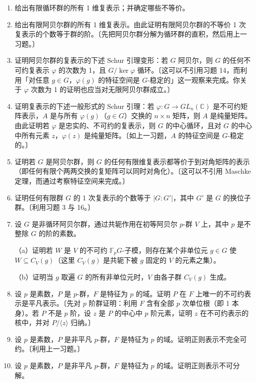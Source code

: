 \begin{enumerate}
（d）证明若 \(\varphi\) 是忠实的不可约表示，则 \(G\) 的中心循环。

（e）由（d）推出若 \(G\) 阿贝尔且 \(\varphi\) 是任意不可约表示，则 \(G/\ker\varphi\) 循环。

\item 给出有限循环群的所有 1 维复表示；并确定哪些不等价。

\item 给出有限阿贝尔群的所有 1 维复表示。由此证明有限阿贝尔群的不等价 1 次复表示的个数等于群的阶。〔先把阿贝尔群分解为循环群的直积，然后用上一习题。〕

\item 证明阿贝尔群的复表示的下述 Schur 引理变形：若 \(G\) 阿贝尔，则 \(G\) 的任何不可约复表示 \(\varphi\) 的次数为 1，且 \(G/\ker\varphi\) 循环。〔这可以不引用习题 14，而利用「对任意 \(g \in G\)，\(\varphi(g)\) 的特征空间是 \(G\)-稳定的」这一观察来完成。你关于 \(\varphi\) 次数为 1 的证明也应当对无限阿贝尔群成立。〕

\item 证明复表示的下述一般形式的 Schur 引理：若 \(\varphi : G \to GL_n(\mathbb{C})\) 是不可约矩阵表示，\(A\) 是与所有 \(\varphi(g)\)（\(g \in G\)）交换的 \(n \times n\) 矩阵，则 \(A\) 是纯量矩阵。由此证明若 \(\varphi\) 是忠实的、不可约的复表示，则 \(G\) 的中心循环，且对 \(G\) 的中心中所有元素 \(z\)，\(\varphi(z)\) 是纯量矩阵。〔如上一习题，\(A\) 的特征空间是 \(G\)-稳定的。〕

\item 证明若 \(G\) 是阿贝尔群，则 \(G\) 的任何有限维复表示都等价于到对角矩阵的表示（即任何有限个两两交换的复矩阵可以同时对角化）。〔这可以不引用 Maschke 定理，而通过考察特征空间来完成。〕

\item 证明任何有限群 \(G\) 的 1 次复表示的个数等于 \(|G:G'|\)，其中 \(G'\) 是 \(G\) 的换位子群。〔利用习题 3 与 16。〕

\item 设 \(G\) 是非循环阿贝尔群，通过共轭作用在初等阿贝尔 \(p\)-群 \(V\) 上，其中 \(p\) 是不整除 \(G\) 的阶的素数。

（a）证明若 \(W\) 是 \(V\) 的不可约 \(\mathbb{F}_pG\)-子模，则存在某个非单位元 \(g \in G\) 使 \(W \subseteq C_V(g)\)（这里 \(C_V(g)\) 是共轭下被 \(g\) 固定的 \(V\) 的元素之集）。

（b）证明当 \(g\) 取遍 \(G\) 的所有非单位元时，\(V\) 由各子群 \(C_V(g)\) 生成。

\item 设 \(p\) 是素数，\(P\) 是 \(p\)-群，\(F\) 是特征为 \(p\) 的域。证明 \(P\) 在 \(F\) 上唯一的不可约表示是平凡表示。〔先对 \(p\) 阶群证明：利用 \(F\) 含有全部 \(p\) 次单位根（即 1 本身）。若 \(P\) 不是 \(p\) 阶，设 \(z\) 是 \(P\) 的中心中 \(p\) 阶元素，证明 \(z\) 在不可约表示的核中，并对 \(P/\langle z\rangle\) 归纳。〕

\item 设 \(p\) 是素数，\(P\) 是非平凡 \(p\)-群，\(F\) 是特征为 \(p\) 的域。证明正则表示不完全可约。〔利用上一习题。〕

\item 设 \(p\) 是素数，\(P\) 是非平凡 \(p\)-群，\(F\) 是特征为 \(p\) 的域。证明正则表示不可分解。
\end{enumerate}

